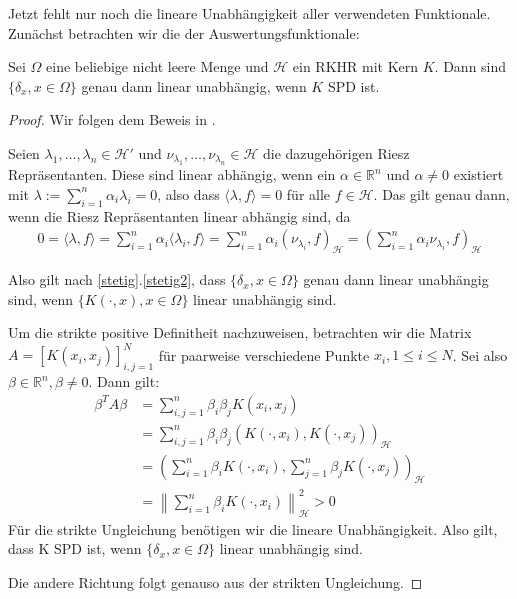 Jetzt fehlt nur noch die lineare Unabhängigkeit aller verwendeten Funktionale. Zunächst betrachten wir die der Auswertungsfunktionale:
\begin{theorem}
Sei $\Omega$ eine beliebige nicht leere Menge und $\mathcal{H}$ ein \ac{RKHR} mit Kern $K$. Dann sind $\{\delta_x,x\in \Omega\}$ genau dann linear unabhängig, wenn $K$ \ac{SPD} ist.
\end{theorem}

\begin{proof}
Wir folgen dem Beweis in \textcite[Proposition 3.8]{Santin.2017}.

Seien $\lambda_1, \dots, \lambda_n \in \mathcal{H}'$ und $\nu_{\lambda_1},\dots, \nu_{\lambda_n} \in \mathcal{H}$ die dazugehörigen Riesz Repräsentanten. Diese sind linear abhängig, wenn ein $\alpha \in \mathbb{R}^n$ und $\alpha \neq 0$ existiert mit $\lambda := \sum_{i=1}^n \alpha_i \lambda_i = 0$, also dass $\langle \lambda,f \rangle = 0$ für alle $f \in \mathcal{H}$. Das gilt genau dann, wenn die Riesz Repräsentanten linear abhängig sind, da
\begin{align*}
0 = \langle \lambda,f \rangle = \sum_{i=1}^n \alpha_i \langle \lambda_i,f \rangle = \sum_{i=1}^n \alpha_i \left( \nu_{\lambda_i},f\right)_\mathcal{H} = \left( \sum_{i=1}^n \alpha_i \nu_{\lambda_i}, f \right)_\mathcal{H}
\end{align*}

Also gilt nach \ref{stetig}.\ref{stetig2}, dass $\{\delta_x,x\in \Omega\}$ genau dann linear unabhängig sind, wenn $\{K(\cdot,x) , x \in \Omega\}$ linear unabhängig sind.

Um die strikte positive Definitheit nachzuweisen, betrachten wir die Matrix $A=[K(x_i, x_j)]_{i,j=1}^N$ für paarweise verschiedene Punkte $x_i, 1 \le i \le N$. Sei also $\beta \in \mathbb{R}^n, \beta \neq 0$. Dann gilt:
\begin{align*}
\beta^T A \beta &= \sum_{i,j=1}^n \beta_i \beta_j K(x_i, x_j)\\
&= \sum_{i,j=1}^n \beta_i  \beta_j \left(K(\cdot, x_i),K(\cdot,x_j)\right)_\mathcal{H}\\
&= \left( \sum_{i=1}^n \beta_i K(\cdot,x_i),\sum_{j=1}^n \beta_j K(\cdot, x_j) \right)_\mathcal{H}\\
&= \left\| \sum_{i=1}^n \beta_i K(\cdot, x_i) \right\|_\mathcal{H}^2 > 0
\end{align*}
Für die strikte Ungleichung benötigen wir die lineare Unabhängigkeit. Also gilt, dass K \ac{SPD} ist, wenn $\{\delta_x,x\in \Omega\}$ linear unabhängig sind.

Die andere Richtung folgt genauso aus der strikten Ungleichung.
\end{proof}

